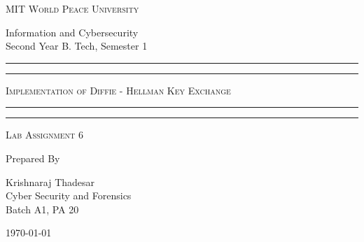 \documentclass[11pt]{article}
\begin{document}
\begin{titlepage}
    \centering


    \huge\textsc{
        MIT World Peace University
    }\\

    \vspace{0.75\baselineskip} %

    \LARGE{
        Information and Cybersecurity\\
        Second Year B. Tech, Semester 1
    }

    \vfill %


    \rule{\textwidth}{1.6pt}\vspace*{-\baselineskip}\vspace*{2pt}
    \rule{\textwidth}{0.6pt}
    \vspace{0.75\baselineskip} %



    \huge{\textsc{
            Implementation of Diffie - Hellman Key Exchange
        }} \\



    \vspace{0.5\baselineskip} %
    \rule{\textwidth}{0.6pt}\vspace*{-\baselineskip}\vspace*{2.8pt}
    \rule{\textwidth}{1.6pt}

    \vspace{1\baselineskip} %


    \LARGE\textsc{
        Lab Assignment 6
    } %
    \vfill


    Prepared By
    \vspace{0.5\baselineskip} %

    \Large{
        Krishnaraj Thadesar \\
        Cyber Security and Forensics\\
        Batch A1, PA 20
    }


    \vspace{0.5\baselineskip} %
    \today

\end{titlepage}
\end{document}
